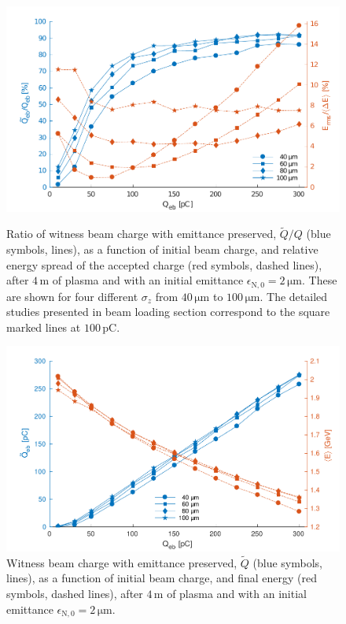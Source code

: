 \documentclass[aps,prstab,reprint,amsmath,amssymb,groupedaddress]{revtex4-1}
\newcommand{\unit}[1]{\,\mathrm{#1}}
\begin{document}
\begin{figure}[hbt]
    \begin{minipage}[t]{.48\textwidth}
        \includegraphics[width=\linewidth,trim={2mm 0mm 2mm 0mm},clip]{figures/beamQuality}
        \caption{\label{Fig:BeamQ} Ratio of witness beam charge with emittance preserved, $\widetilde{Q}/Q$ (blue symbols, lines), as a function of initial beam charge, and relative energy spread of the accepted charge (red symbols, dashed lines), after $4\unit{m}$ of plasma and with an initial emittance $\epsilon_{\mathrm{N},0}=2\unit{\mu m}$. These are shown for four different $\sigma_{z}$ from $40\unit{\mu m}$ to $100\unit{\mu m}$. The detailed studies presented in beam loading section correspond to the square marked lines at $100\unit{pC}$.}
    \end{minipage}\hfill
    \begin{minipage}[t]{.48\textwidth}
        \includegraphics[width=\linewidth,trim={2mm 0mm 2mm 0mm},clip]{figures/beamQualityAbs}
        \caption{\label{Fig:BeamQAbs} Witness beam charge with emittance preserved, $\widetilde{Q}$ (blue symbols, lines), as a function of initial beam charge, and final energy (red symbols, dashed lines), after $4\unit{m}$ of plasma and with an initial emittance $\epsilon_{\mathrm{N},0}=2\unit{\mu m}$.}
    \end{minipage}
\end{figure}
\end{document}

